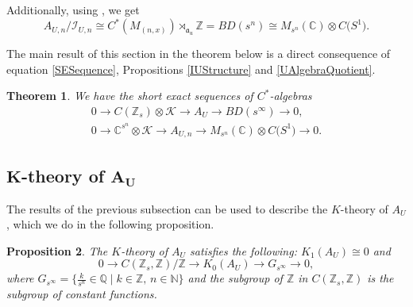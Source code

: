 \documentclass[10pt,a4paper]{amsart}
\newcommand{\C}{{\mathbb C}}
\newcommand{\N}{{\mathbb N}}
\newcommand{\Q}{{\mathbb Q}}
\newcommand{\Z}{{\mathbb Z}}
\newcommand{\fancyI}{\mathcal{I}}
\numberwithin{equation}{section}
\newtheorem{Theorem}{Theorem}[section]
\newtheorem{Proposition}[Theorem]{Proposition}
 { \theoremstyle{definition}
\newtheorem{Definition}[Theorem]{Definition}
\newtheorem{Note}[Theorem]{Note}
\newtheorem{Example}[Theorem]{Example}
\newtheorem{Remark}[Theorem]{Remark} }
\begin{document}
Additionally, using \cite[Proposition 2.9]{KMRSW2}, we get
\begin{equation*}
A_{U,n}/\fancyI_{U,n}\cong C^*(M_{(n,x)})\rtimes_{\mathfrak{a}_u} \Z = BD(s^n)\cong M_{s^n}(\C)\otimes C\bigl(S^1\bigr).
\end{equation*}

The main result of this section in the theorem below is a direct consequence of equation \eqref{SESequence}, Propositions \ref{IUStructure} and \ref{UAlgebraQuotient}.

\begin{Theorem}
We have the short exact sequences of $C^*$-algebras
\begin{gather}
0\rightarrow C(\Z_s)\otimes\mathcal{K}\rightarrow A_U\rightarrow BD(s^\infty)\rightarrow 0,\nonumber
\\
0 \to \C^{s^n}\otimes \mathcal{K}\to A_{U,n} \to M_{s^n}(\C)\otimes C\bigl(S^1\bigr) \to 0.\label{AUExact}
\end{gather}
\end{Theorem}


\subsection[K-theory of A\_U]{$\boldsymbol{K}$-theory of $\boldsymbol{A_U}$}
The results of the previous subsection can be used to describe the $K$-theory of $A_U$, which we do in the following proposition.

\begin{Proposition}
The $K$-theory of $A_U$ satisfies the following: $K_1(A_U) \cong 0$ and
\begin{equation*}
0 \to C(\Z_s, \Z)/\Z \to K_0(A_U) \to G_{s^\infty} \to 0,
\end{equation*}
where $G_{s^\infty} = \bigl\{ \frac{k}{s^n} \in \Q \mid k \in \Z,\, n \in \N \bigr\}$ and the subgroup of $\Z$ in $C(\Z_s,\Z)$ is the subgroup of constant functions.
\end{Proposition}
\end{document}
